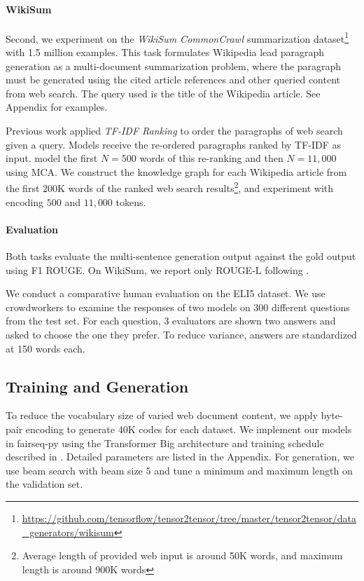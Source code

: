 \documentclass[11pt,a4paper]{article}
\begin{document}
\paragraph{WikiSum} Second, we experiment on the \textit{WikiSum CommonCrawl} \cite{liu2018generating} summarization dataset\footnote{\url{https://github.com/tensorflow/tensor2tensor/tree/master/tensor2tensor/data_generators/wikisum}} with 1.5 million examples. This task formulates Wikipedia lead paragraph generation as a multi-document summarization problem, where the paragraph must be generated using the cited article references and other queried content from web search. The query used is the title of the Wikipedia article. See Appendix for examples.

Previous work \cite{liu2018generating} applied \textit{TF-IDF Ranking} to order the paragraphs of web search given a query. Models receive the re-ordered paragraphs ranked by TF-IDF as input. \citet{liu2018generating} model the first $N=500$ words of this re-ranking and then $N=11,000$ using MCA. We construct the knowledge graph for each Wikipedia article from the first 200K words of the ranked web search results\footnote{Average length of provided web input is around 50K words, and maximum length is around 900K words}, and experiment with encoding $500$ and $11,000$ tokens.

\paragraph{Evaluation} Both tasks evaluate the multi-sentence generation output against the gold output using F1 ROUGE. On WikiSum, we report only ROUGE-L following \cite{liu2018generating}. 

We conduct a comparative human evaluation on the ELI5 dataset. We use crowdworkers to examine the responses of two models on 300 different questions from the test set. For each question, 3 evaluators are shown two answers and asked to choose the one they prefer. To reduce variance, answers are standardized at 150 words each. 

\subsection{Training and Generation}

To reduce the vocabulary size of varied web document content, we apply byte-pair encoding \cite{sennrich2016neural} to generate 40K codes for each dataset. We implement our models in fairseq-py \cite{ott2019fairseq} using the Transformer Big architecture and training schedule described in \cite{vaswani2018attention}. Detailed parameters are listed in the Appendix. For generation, we use beam search with beam size 5 and tune a minimum and maximum length on the validation set.
\end{document}
